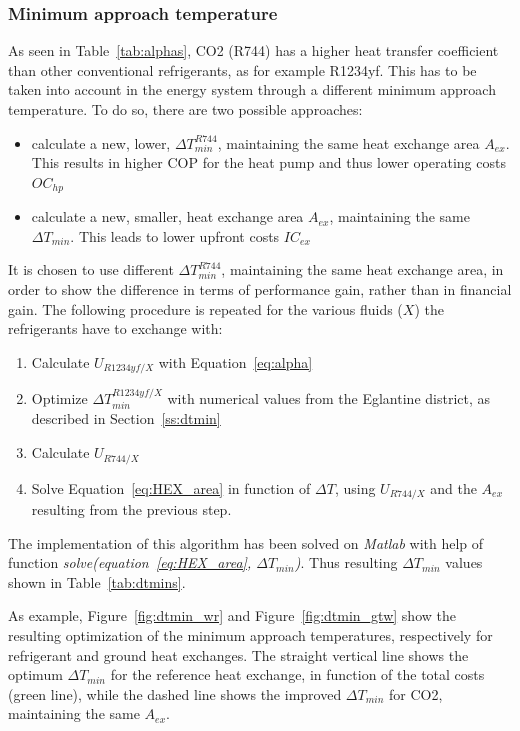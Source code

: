 \documentclass{article}
\begin{document}
\subsubsection{Minimum approach temperature}
As seen in Table~\ref{tab:alphas}, CO2 (R744) has a higher heat transfer coefficient than other conventional refrigerants, as for example R1234yf. This has to be taken into account in the energy system through a different minimum approach temperature. To do so, there are two possible approaches:
\begin{itemize}
	\item calculate a new, lower, $\Delta T_{min}^{R744}$, maintaining the same heat exchange area $A_{ex}$. This results in higher COP for the heat pump and thus lower operating costs $OC_{hp}$
	\item calculate a new, smaller, heat exchange area  $A_{ex}$, maintaining the same $\Delta T_{min}$. This leads to lower upfront costs $IC_{ex}$
\end{itemize}

It is chosen to use different $\Delta T_{min}^{R744}$, maintaining the same heat exchange area, in order to show the difference in terms of performance gain, rather than in financial gain. The following procedure is repeated for the various fluids ($X$) the refrigerants have to exchange with:
\begin{enumerate}
	\item Calculate $U_{R1234yf/X}$ with Equation~\ref{eq:alpha}
	\item Optimize $\Delta T_{min}^{R1234yf/X}$ with numerical values from the Eglantine district, as described in Section~\ref{ss:dtmin}
	\item Calculate  $U_{R744/X}$ 
	\item Solve Equation~\ref{eq:HEX_area} in function of $\Delta T$, using $U_{R744/X}$ and the $A_{ex}$ resulting from the previous step.
\end{enumerate}

The implementation of this algorithm has been solved on \textit{Matlab} with help of function \textit{solve(equation~\ref{eq:HEX_area}, $\Delta T_{min}$)}.
Thus resulting $\Delta T_{min}$ values shown in Table~\ref{tab:dtmins}.



As example, Figure~\ref{fig:dtmin_wr} and Figure~\ref{fig:dtmin_gtw} show the resulting optimization of the minimum approach temperatures, respectively for refrigerant and ground heat exchanges. The straight vertical line shows the optimum $\Delta T_{min}$ for the reference heat exchange, in function of the total costs (green line), while the dashed line shows the improved $\Delta T_{min}$ for CO2, maintaining the same $A_{ex}$.
\end{document}
